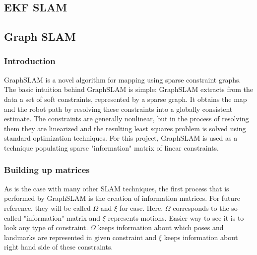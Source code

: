 \documentclass{ba-kecs}
\numberwithin{figure}{section}
\numberwithin{equation}{section}
\begin{document}
\subsection{EKF SLAM}

\subsection{Graph SLAM}

\subsubsection{Introduction}
GraphSLAM is a novel algorithm for mapping using sparse constraint graphs. The basic intuition behind GraphSLAM is simple: GraphSLAM extracts from the data a set of soft constraints, represented by a sparse graph. It obtains the map and the robot path by resolving these constraints into a globally consistent estimate. The constraints are generally nonlinear, but in the process of resolving them they are linearized and the resulting least squares problem is solved using standard optimization techniques\cite{sik}. For this project, GraphSLAM is used as a technique populating sparse "information" matrix of linear constraints.

\subsubsection{Building up matrices}
As is the case with many other SLAM techniques, the first process that is performed by GraphSLAM is the creation of information matrices. For future reference, they will be called $\Omega$ and $\xi$ for ease. Here, $\Omega$ corresponds to the so-called "information" matrix and $\xi$ represents motions. Easier way to see it is to look any type of constraint. $\Omega$ keeps information about which poses and landmarks are represented in given constraint and $\xi$ keeps information about right hand side of these constraints.
	
\end{document}

